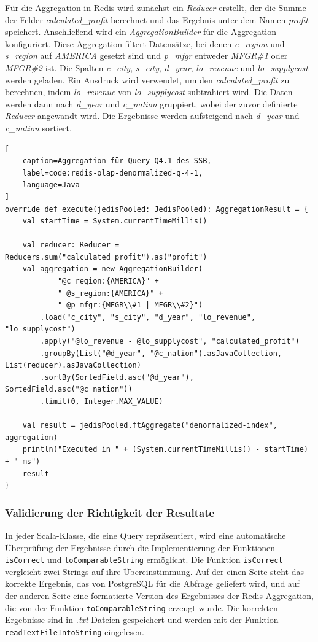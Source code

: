 Für die Aggregation in Redis wird zunächst ein \emph{Reducer} erstellt, der die Summe der Felder \emph{calculated\_profit} berechnet und das Ergebnis unter dem Namen \emph{profit} speichert. Anschließend wird ein \emph{AggregationBuilder} für die Aggregation konfiguriert. Diese Aggregation filtert Datensätze, bei denen \emph{c\_region} und \emph{s\_region} auf \emph{AMERICA} gesetzt sind und \emph{p\_mfgr} entweder \emph{MFGR\#1} oder \emph{MFGR\#2} ist.
Die Spalten \emph{c\_city}, \emph{s\_city}, \emph{d\_year}, \emph{lo\_revenue} und \emph{lo\_supplycost} werden geladen. Ein Ausdruck wird verwendet, um den \emph{calculated\_profit} zu berechnen, indem \emph{lo\_revenue} von \emph{lo\_supplycost} subtrahiert wird.
Die Daten werden dann nach \emph{d\_year} und \emph{c\_nation} gruppiert, wobei der zuvor definierte \emph{Reducer} angewandt wird. Die Ergebnisse werden aufsteigend nach \emph{d\_year} und \emph{c\_nation} sortiert.

\begin{lstlisting}[
    caption=Aggregation für Query Q4.1 des SSB,
    label=code:redis-olap-denormalized-q-4-1,
    language=Java
]
override def execute(jedisPooled: JedisPooled): AggregationResult = {
	val startTime = System.currentTimeMillis()

	val reducer: Reducer = Reducers.sum("calculated_profit").as("profit")
	val aggregation = new AggregationBuilder(
			"@c_region:{AMERICA}" +
			" @s_region:{AMERICA}" +
			" @p_mfgr:{MFGR\\#1 | MFGR\\#2}")
		.load("c_city", "s_city", "d_year", "lo_revenue", "lo_supplycost")
		.apply("@lo_revenue - @lo_supplycost", "calculated_profit")
		.groupBy(List("@d_year", "@c_nation").asJavaCollection, List(reducer).asJavaCollection)
		.sortBy(SortedField.asc("@d_year"), SortedField.asc("@c_nation"))
		.limit(0, Integer.MAX_VALUE)

	val result = jedisPooled.ftAggregate("denormalized-index", aggregation)
	println("Executed in " + (System.currentTimeMillis() - startTime) + " ms")
	result
}
\end{lstlisting}


\subsubsection{Validierung der Richtigkeit der Resultate}
In jeder Scala-Klasse, die eine Query repräsentiert, wird eine automatische Überprüfung der Ergebnisse durch die Implementierung der Funktionen \lstinline|isCorrect| und \lstinline|toComparableString| ermöglicht.
Die Funktion \lstinline|isCorrect| vergleicht zwei Strings auf ihre Übereinstimmung. Auf der einen Seite steht das korrekte Ergebnis, das von PostgreSQL für die Abfrage geliefert wird, und auf der anderen Seite eine formatierte Version des Ergebnisses der Redis-Aggregation, die von der Funktion \lstinline|toComparableString| erzeugt wurde.
Die korrekten Ergebnisse sind in \emph{.txt}-Dateien gespeichert und werden mit der Funktion \lstinline|readTextFileIntoString| eingelesen.

